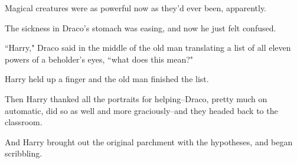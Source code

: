 Magical creatures were as powerful now as they'd ever been, apparently.

The sickness in Draco's stomach was easing, and now he just felt confused.

``Harry," Draco said in the middle of the old man translating a list of all eleven powers of a beholder's eyes, ``what does this mean?"

Harry held up a finger and the old man finished the list.

Then Harry thanked all the portraits for helping\---Draco, pretty much on automatic, did so as well and more graciously\---and they headed back to the classroom.

And Harry brought out the original parchment with the hypotheses, and began scribbling.

\pagebreak[2]

